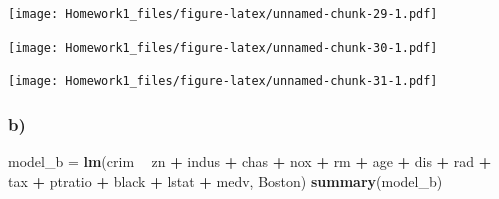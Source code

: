 \documentclass[]{article}
\newenvironment{Shaded}{\begin{snugshade}}{\end{snugshade}}
\newcommand{\KeywordTok}[1]{\textcolor[rgb]{0.13,0.29,0.53}{\textbf{#1}}}
\newcommand{\StringTok}[1]{\textcolor[rgb]{0.31,0.60,0.02}{#1}}
\newcommand{\OperatorTok}[1]{\textcolor[rgb]{0.81,0.36,0.00}{\textbf{#1}}}
\newcommand{\NormalTok}[1]{#1}
\begin{document}
\texttt{[image: Homework1\_files/figure-latex/unnamed-chunk-29-1.pdf]}

\begin{Shaded}
\end{Shaded}

\texttt{[image: Homework1\_files/figure-latex/unnamed-chunk-30-1.pdf]}

\begin{Shaded}
\end{Shaded}

\texttt{[image: Homework1\_files/figure-latex/unnamed-chunk-31-1.pdf]}

\subsubsection{b)}\label{b-4}

\begin{Shaded}
\begin{Highlighting}[]
\NormalTok{model_b =}\StringTok{ }\KeywordTok{lm}\NormalTok{(crim }\OperatorTok{~}\StringTok{ }\NormalTok{zn }\OperatorTok{+}\StringTok{ }\NormalTok{indus }\OperatorTok{+}\StringTok{ }\NormalTok{chas }\OperatorTok{+}\StringTok{ }\NormalTok{nox }\OperatorTok{+}\StringTok{ }\NormalTok{rm }\OperatorTok{+}\StringTok{ }\NormalTok{age }\OperatorTok{+}\StringTok{ }\NormalTok{dis }\OperatorTok{+}\StringTok{ }\NormalTok{rad }\OperatorTok{+}\StringTok{ }\NormalTok{tax }\OperatorTok{+}\StringTok{ }\NormalTok{ptratio }\OperatorTok{+}\StringTok{ }\NormalTok{black }\OperatorTok{+}\StringTok{ }\NormalTok{lstat }\OperatorTok{+}\StringTok{ }\NormalTok{medv, Boston)}
\KeywordTok{summary}\NormalTok{(model_b)}
\end{Highlighting}
\end{Shaded}
\end{document}
